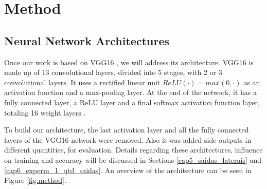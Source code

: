\section{Method}
\label{cap5_metodologia}

\subsection{Neural Network Architectures}
\label{cap5_rede_neural}

Once our work is based on VGG16 \cite{VGGNET:2014}, we will address its architecture.
VGG16 is made up of 13 convolutional layers, divided into 5 stages, with 2 or 3 convolutional layers.
It uses a rectified linear unit $ReLU(\cdot) = max(0, \cdot)$ as an activation function and a max-pooling layer.
At the end of the network, it has a fully connected layer, a ReLU layer and a final softmax activation function layer, totaling 16 weight layers \cite{VGGNET:2014}.


To build our architecture, the last activation layer and all the fully connected layers of the VGG16 network were removed.
Also it was added side-outputs in different quantities, for evaluation.
Details regarding these architectures, influence on training and accuracy will be discussed in Sections \ref{cap5_saidas_laterais} and \ref{cap6_experm_1_qtd_saidas}.
An overview of the architecture can be seen in Figure \ref{fig:method}.

